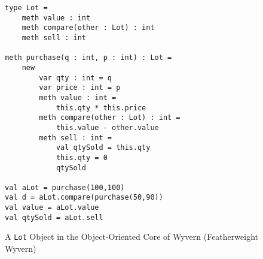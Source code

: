 \begin{figure}
  \centering
\begin{lstlisting}
type Lot =
	meth value : int
	meth compare(other : Lot) : int
	meth sell : int

meth purchase(q : int, p : int) : Lot =
	new
		var qty : int = q
		var price : int = p
		meth value : int =
			this.qty * this.price
		meth compare(other : Lot) : int =
			this.value - other.value
		meth sell : int =
			val qtySold = this.qty
			this.qty = 0
			qtySold
			
val aLot = purchase(100,100)
val d = aLot.compare(purchase(50,90))
val value = aLot.value
val qtySold = aLot.sell
\end{lstlisting}
\caption{A \texttt{Lot} Object in the Object-Oriented Core of Wyvern (Featherweight Wyvern)}
\label{f-core2-example}
\end{figure}
